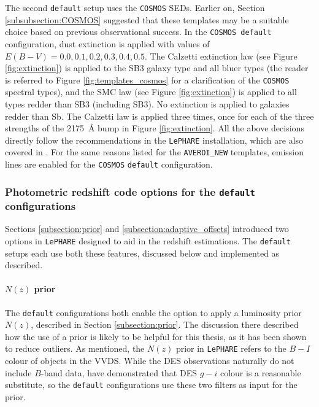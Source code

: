 The second \texttt{default} setup uses the \texttt{COSMOS} SEDs. Earlier on, Section \ref{subsubsection:COSMOS} suggested that these templates may be a suitable choice based on previous observational success. In the \texttt{COSMOS default} configuration, dust extinction is applied with values of $E(B-V) = 0.0, 0.1, 0.2, 0.3, 0.4, 0.5$. The Calzetti extinction law (see Figure \ref{fig:extinction}) is applied to the SB3 galaxy type and all bluer types (the reader is referred to Figure \ref{fig:templates_cosmos} for a clarification of the \texttt{COSMOS} spectral types), and the SMC law (see Figure \ref{fig:extinction}) is applied to all types redder than SB3 (including SB3). No extinction is applied to galaxies redder than Sb. The Calzetti law is applied three times, once for each of the three strengths of the \SI{2175}{\angstrom} bump in Figure \ref{fig:extinction}. All the above decisions directly follow the recommendations in the \texttt{LePHARE} installation, which are also covered in \cite{2009ApJ...690.1236I}. For the same reasons listed for the \texttt{AVEROI\_NEW} templates, emission lines are enabled for the \texttt{COSMOS} \texttt{default} configuration.\par 



\subsubsection{Photometric redshift code options for the \texttt{default} configurations}\label{subsubsection:photoz_options_default}
Sections \ref{subsection:prior} and \ref{subsection:adaptive_offsets} introduced two options in \texttt{LePHARE} designed to aid in the redshift estimations. The \texttt{default} setups each use both these features, discussed below and implemented as described.\par


\paragraph{$N(z)$ prior} The \texttt{default} configurations both enable the option to apply a luminosity prior $N(z)$, described in Section \ref{subsection:prior}. The discussion there described how the use of a prior is likely to be helpful for this thesis, as it has been shown to reduce outliers. As mentioned, the $N(z)$ prior in \texttt{LePHARE} refers to the $B-I$ colour of objects in the VVDS. While the DES observations naturally do not include $B$-band data, \cite{2014MNRAS.445.1482S} have demonstrated that DES $g-i$ colour is a reasonable substitute, so the \texttt{default} configurations use these two filters as input for the prior. \par



